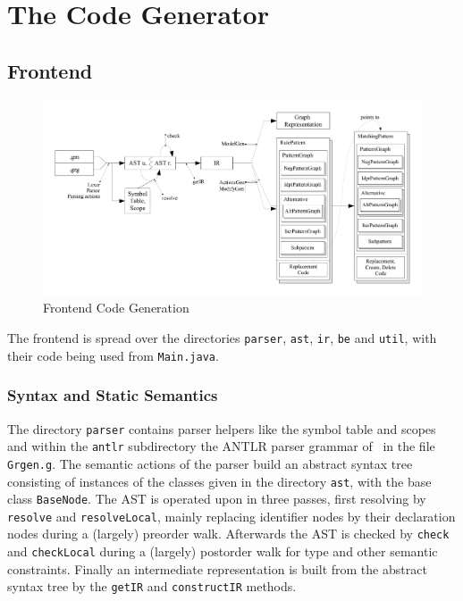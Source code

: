 \section{The Code Generator}

\subsection{Frontend}

\begin{figure}[htbp]
  \centering
  \includegraphics[width=\textwidth]{fig/AblaufCodeerzeugungFrontend}
  \caption{Frontend Code Generation}
  \label{figfrontendcodegen}
\end{figure}

The frontend is spread over the directories \texttt{parser}, \texttt{ast}, \texttt{ir}, \texttt{be} and \texttt{util}, with their code being used from \texttt{Main.java}.

\subsubsection*{Syntax and Static Semantics}
The directory \texttt{parser} contains parser helpers like the symbol table and scopes and within the \texttt{antlr} subdirectory the ANTLR parser grammar of \GrG~in the file \texttt{Grgen.g}.
The semantic actions of the parser build an abstract syntax tree consisting of instances of the classes given in the directory \texttt{ast}, with the base class \texttt{BaseNode}.
The AST is operated upon in three passes, first resolving by \texttt{resolve} and \texttt{resolveLocal}, mainly replacing identifier nodes by their declaration nodes during a (largely) preorder walk.
Afterwards the AST is checked by \texttt{check} and \texttt{checkLocal} during a (largely) postorder walk for type and other semantic constraints.
Finally an intermediate representation is built from the abstract syntax tree by the \texttt{getIR} and \texttt{constructIR} methods.

